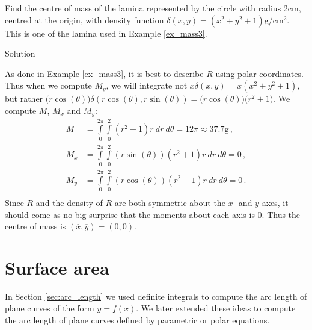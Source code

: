 \begin{example}\label{ex_mass8}
Find the centre of mass of the lamina represented by the circle with radius 2cm, centred at the origin, with density function $\delta(x,y) = (x^2+y^2+1)$g/cm$^2$. This is one of the lamina used in Example \ref{ex_mass3}.

Solution 

As done in Example \ref{ex_mass3}, it is best to describe $R$ using polar coordinates.
Thus when we compute $M_y$, we will integrate not $x\delta(x,y) = x(x^2+y^2+1)$, but rather $\big(r\cos(\theta)\big)\delta(r\cos(\theta),r\sin(\theta))$\linebreak $= \big(r\cos(\theta)\big)\big(r^2+1\big).$ We compute $M$, $M_x$ and $M_y$:
\allowdisplaybreaks
\begin{align*}
M &= \int\limits_0^{2\pi}\int\limits_0^2 (r^2+1)r\ dr\ d\theta = 12\pi\approx 37.7\text{g}\,,\\
M_x &= \int\limits_0^{2\pi}\int\limits_0^2 (r\sin(\theta))(r^2+1)r \ dr\ d\theta = 0\,,\\
M_y &= \int\limits_0^{2\pi}\int\limits_0^2 (r\cos(\theta))(r^2+1)r \ dr\ d\theta = 0\,.\\
\end{align*}
Since $R$ and the density of $R$ are both symmetric about the $x$- and $y$-axes, it should come as no big surprise that the moments about each axis is 0. Thus the centre of mass is $(\overline{x},\overline{y})=(0,0)$. 
\end{example}

\section{Surface area}\label{sec:surface_area}
	\checkoddpage
{}

In Section \ref{sec:arc_length} we used definite integrals to compute the arc length of plane curves of the form \linebreak $y=f(x)$. We later extended these ideas to compute the arc length of plane curves defined by parametric or polar equations. 

